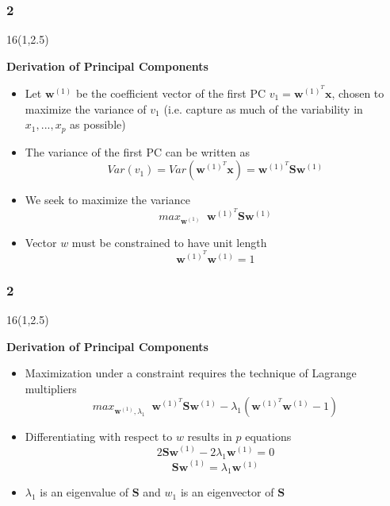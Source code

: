 \documentclass{beamer}
\newcommand\FrameText[1]{
\begin{textblock}{16}(1,2.5)
\raggedright #1
\end{textblock}}
\begin{document}
\begin{frame}
\frametitle{2}
\FrameText{\bf{\large Derivation of Principal Components}}
\begin{itemize}
\item Let $\mathbf{w}^{(1)}$ be the coefficient vector of the
  first PC $v_1=\mathbf{w}^{(1)^{T}}\mathbf{x}$, chosen to maximize
  the variance of $v_1$ (i.e. capture as much of the variability in
  $x_1,...,x_p$ as possible)
\item The variance of the first PC can be written as
\begin{equation}
Var(v_1)=Var(\mathbf{w}^{(1)^{T}}\mathbf{x})=\mathbf{w}^{(1)^{T}}\mathbf{S}\mathbf{w}^{(1)}
\end{equation}
\item We seek to maximize the variance
\begin{equation}
max_{\mathbf{w}^{(1)}}\;\;\mathbf{w}^{(1)^{T}}\mathbf{S}\mathbf{w}^{(1)}
\end{equation}
\item Vector $w$ must be constrained to have unit length
\begin{equation}
\mathbf{w}^{(1)^{T}}\mathbf{w}^{(1)}=1
\end{equation}
\end{itemize}
\end{frame}

\begin{frame}
\frametitle{2}
\FrameText{\bf{\large Derivation of Principal Components}}
\begin{itemize}
\item Maximization under a constraint requires the technique of Lagrange multipliers
\begin{equation}
max_{\mathbf{w}^{(1)},\lambda_1}\;\;\mathbf{w}^{(1)^{T}}\mathbf{S}\mathbf{w}^{(1)}-\lambda_1(\mathbf{w}^{(1)^{T}}\mathbf{w}^{(1)}-1)
\label{eq1}
\end{equation}
\item Differentiating with respect to $w$ results in $p$ equations
\begin{equation}
2\mathbf{Sw}^{(1)}-2\lambda_1\mathbf{w}^{(1)}=0
\end{equation}
\begin{equation}
\mathbf{Sw}^{(1)}=\lambda_1\mathbf{w}^{(1)}
\label{eq}
\end{equation}
\item $\lambda_1$ is an eigenvalue of $\mathbf{S}$ and $w_1$ is an eigenvector of $\mathbf{S}$
\end{itemize}
\end{frame}
\end{document}
